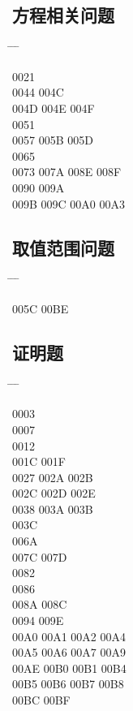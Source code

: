 \documentclass[twoside, twocolumn]{ctexart}
\newenvironment{problist}{
  \begin{center} \ttfamily \begin{tabbing}
      \hspace{50pt} \= \hspace{50pt} \= \hspace{50pt} \= \kill
  }{ \end{tabbing} \end{center} }
\begin{document}
  \subsection*{方程相关问题}

  \begin{problist}
    0021    \\ 0044   \> 004C \\
    004D \> 004E \> 004F  \\ 0051    \\
    0057 \> 005B \> 005D  \\ 0065    \\
    0073 \> 007A \> 008E \> 008F \\ 0090   \> 009A \\
    009B \> 009C \> 00A0 \> 00A3 \\
  \end{problist}

  \subsection*{取值范围问题}

  \begin{problist}
    005C   \> 00BE \\
  \end{problist}

  \subsection*{证明题}

  \begin{problist}
    0003    \\ 0007    \\
    0012    \\ 001C \> 001F   \\
    0027  \> 002A \> 002B \\ 002C \> 002D \> 002E  \\
    0038  \> 003A \> 003B \\ 003C    \\
    006A    \\ 007C \> 007D   \\
    0082    \\ 0086    \\
    008A \> 008C   \\ 0094   \> 009E \\
    00A0 \> 00A1 \> 00A2 \> 00A4 \\ 00A5 \> 00A6 \> 00A7 \> 00A9 \\
    00AE \> 00B0 \> 00B1 \> 00B4 \\ 00B5 \> 00B6 \> 00B7 \> 00B8 \\
    00BC \> 00BF \\
  \end{problist}
\end{document}
